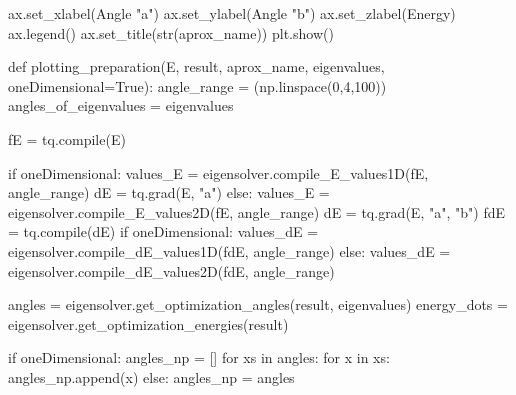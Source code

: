 \documentclass[
  letterpaper,
  DIV=11,
  numbers=noendperiod]{scrartcl}
\newenvironment{Shaded}{\begin{snugshade}}{\end{snugshade}}
\newcommand{\BuiltInTok}[1]{\textcolor[rgb]{0.00,0.23,0.31}{#1}}
\newcommand{\ControlFlowTok}[1]{\textcolor[rgb]{0.00,0.23,0.31}{#1}}
\newcommand{\DecValTok}[1]{\textcolor[rgb]{0.68,0.00,0.00}{#1}}
\newcommand{\KeywordTok}[1]{\textcolor[rgb]{0.00,0.23,0.31}{#1}}
\newcommand{\NormalTok}[1]{\textcolor[rgb]{0.00,0.23,0.31}{#1}}
\newcommand{\OperatorTok}[1]{\textcolor[rgb]{0.37,0.37,0.37}{#1}}
\newcommand{\StringTok}[1]{\textcolor[rgb]{0.13,0.47,0.30}{#1}}
\newcommand{\VariableTok}[1]{\textcolor[rgb]{0.07,0.07,0.07}{#1}}
\begin{document}
\begin{Shaded}
\begin{Highlighting}[]
\NormalTok{        ax.set\_xlabel(}\StringTok{\textquotesingle{}Angle "a"\textquotesingle{}}\NormalTok{)}
\NormalTok{        ax.set\_ylabel(}\StringTok{\textquotesingle{}Angle "b"\textquotesingle{}}\NormalTok{)}
\NormalTok{        ax.set\_zlabel(}\StringTok{\textquotesingle{}Energy\textquotesingle{}}\NormalTok{)}
\NormalTok{        ax.legend()}
\NormalTok{        ax.set\_title(}\BuiltInTok{str}\NormalTok{(aprox\_name))}
\NormalTok{        plt.show()}

    \KeywordTok{def}\NormalTok{ plotting\_preparation(E, result, aprox\_name, eigenvalues, oneDimensional}\OperatorTok{=}\VariableTok{True}\NormalTok{):}
\NormalTok{        angle\_range }\OperatorTok{=}\NormalTok{ (np.linspace(}\DecValTok{0}\NormalTok{,}\DecValTok{4}\NormalTok{,}\DecValTok{100}\NormalTok{))}
\NormalTok{        angles\_of\_eigenvalues }\OperatorTok{=}\NormalTok{ eigenvalues}

\NormalTok{        fE }\OperatorTok{=}\NormalTok{ tq.}\BuiltInTok{compile}\NormalTok{(E)}
        
        \ControlFlowTok{if}\NormalTok{ oneDimensional:}
\NormalTok{            values\_E }\OperatorTok{=}\NormalTok{ eigensolver.compile\_E\_values1D(fE, angle\_range)}
\NormalTok{            dE }\OperatorTok{=}\NormalTok{ tq.grad(E, }\StringTok{"a"}\NormalTok{)}
        \ControlFlowTok{else}\NormalTok{:}
\NormalTok{            values\_E }\OperatorTok{=}\NormalTok{ eigensolver.compile\_E\_values2D(fE, angle\_range)}
\NormalTok{            dE }\OperatorTok{=}\NormalTok{ tq.grad(E, }\StringTok{"a"}\NormalTok{, }\StringTok{"b"}\NormalTok{)}
\NormalTok{        fdE }\OperatorTok{=}\NormalTok{ tq.}\BuiltInTok{compile}\NormalTok{(dE)}
        \ControlFlowTok{if}\NormalTok{ oneDimensional:}
\NormalTok{            values\_dE }\OperatorTok{=}\NormalTok{ eigensolver.compile\_dE\_values1D(fdE, angle\_range)}
        \ControlFlowTok{else}\NormalTok{:}
\NormalTok{            values\_dE }\OperatorTok{=}\NormalTok{ eigensolver.compile\_dE\_values2D(fdE, angle\_range)}
        
\NormalTok{        angles }\OperatorTok{=}\NormalTok{ eigensolver.get\_optimization\_angles(result, eigenvalues)}
\NormalTok{        energy\_dots }\OperatorTok{=}\NormalTok{ eigensolver.get\_optimization\_energies(result)}
        
        \ControlFlowTok{if}\NormalTok{ oneDimensional:}
\NormalTok{            angles\_np }\OperatorTok{=}\NormalTok{ []}
            \ControlFlowTok{for}\NormalTok{ xs }\KeywordTok{in}\NormalTok{ angles:}
                \ControlFlowTok{for}\NormalTok{ x }\KeywordTok{in}\NormalTok{ xs:}
\NormalTok{                    angles\_np.append(x)}
        \ControlFlowTok{else}\NormalTok{:}
\NormalTok{            angles\_np }\OperatorTok{=}\NormalTok{ angles}


\end{Highlighting}
\end{Shaded}
\end{document}
